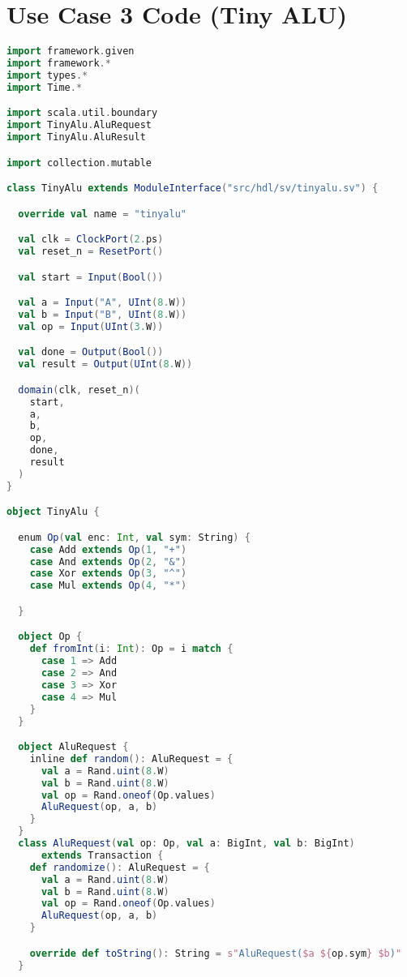\newpage
\section{Use Case 3 Code (Tiny ALU)} %
\label{sec:alu_test}

\begin{lstlisting}[language=scala, captionpos=b, caption=Test code for the tiny ALU.,label=lst:alu_test]
import framework.given
import framework.*
import types.*
import Time.*

import scala.util.boundary
import TinyAlu.AluRequest
import TinyAlu.AluResult

import collection.mutable

class TinyAlu extends ModuleInterface("src/hdl/sv/tinyalu.sv") {

  override val name = "tinyalu"

  val clk = ClockPort(2.ps)
  val reset_n = ResetPort()

  val start = Input(Bool())

  val a = Input("A", UInt(8.W))
  val b = Input("B", UInt(8.W))
  val op = Input(UInt(3.W))

  val done = Output(Bool())
  val result = Output(UInt(8.W))

  domain(clk, reset_n)(
    start,
    a,
    b,
    op,
    done,
    result
  )
}

object TinyAlu {

  enum Op(val enc: Int, val sym: String) {
    case Add extends Op(1, "+")
    case And extends Op(2, "&")
    case Xor extends Op(3, "^")
    case Mul extends Op(4, "*")

  }

  object Op {
    def fromInt(i: Int): Op = i match {
      case 1 => Add
      case 2 => And
      case 3 => Xor
      case 4 => Mul
    }
  }

  object AluRequest {
    inline def random(): AluRequest = {
      val a = Rand.uint(8.W)
      val b = Rand.uint(8.W)
      val op = Rand.oneof(Op.values)
      AluRequest(op, a, b)
    }
  }
  class AluRequest(val op: Op, val a: BigInt, val b: BigInt)
      extends Transaction {
    def randomize(): AluRequest = {
      val a = Rand.uint(8.W)
      val b = Rand.uint(8.W)
      val op = Rand.oneof(Op.values)
      AluRequest(op, a, b)
    }

    override def toString(): String = s"AluRequest($a ${op.sym} $b)"
  }


\end{lstlisting}
